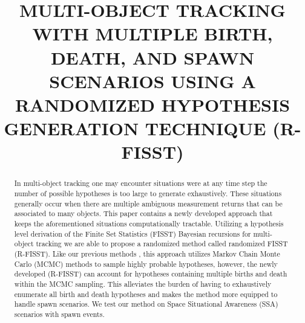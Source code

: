 \documentclass[10pt, conference]{IEEEtran}
\begin{document}
\title{ MULTI-OBJECT TRACKING WITH MULTIPLE BIRTH, DEATH, AND SPAWN SCENARIOS USING A RANDOMIZED HYPOTHESIS GENERATION TECHNIQUE (R-FISST)}

\author{
  \and
{}}
\maketitle

\setlength{\parskip}{0ex}

\begin{abstract}
In multi-object tracking one may encounter situations were at any time step the number of possible hypotheses is too large to generate exhaustively. These situations generally occur when there are multiple ambiguous measurement returns that can be associated to many objects. This paper contains a newly developed approach that keeps the aforementioned situations computationally tractable. Utilizing a hypothesis level derivation of the Finite Set Statistics (FISST) Bayesian recursions for multi-object tracking we are able to propose a randomized method called randomized FISST (R-FISST). Like our previous methods \cite{Faber1, Faber2}, this approach utilizes Markov Chain Monte Carlo (MCMC) methods to sample highly probable hypotheses, however, the newly developed (R-FISST) can account for hypotheses containing multiple births and death within the MCMC sampling.  This alleviates the burden of having to exhaustively enumerate all birth and death hypotheses and makes the method more equipped to handle spawn scenarios. We test our method on Space Situational Awareness (SSA) scenarios with spawn events. 
\end{abstract}
\end{document}
